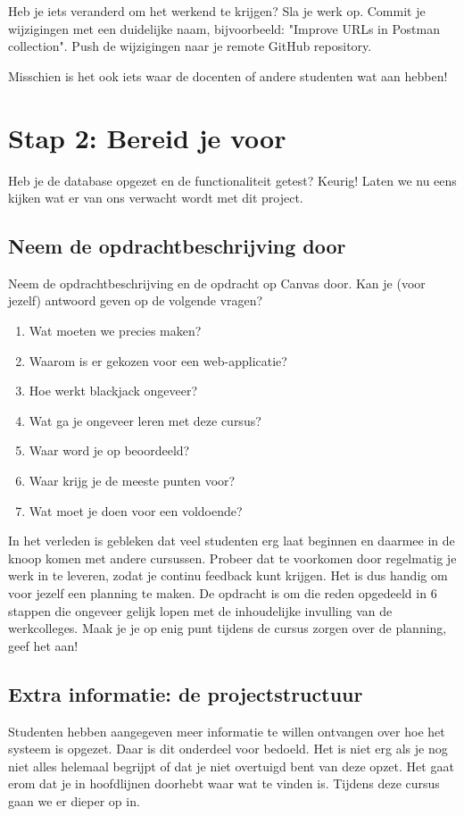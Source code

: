 \documentclass[dutch,a4paper,12pt,doubleside]{book}
\begin{document}
Heb je iets veranderd om het werkend te krijgen? Sla je werk op. 
Commit je wijzigingen met een duidelijke naam, 
bijvoorbeeld: "Improve URLs in Postman collection". 
Push de wijzigingen naar je remote GitHub repository.

Misschien is het ook iets waar de docenten of andere studenten 
wat aan hebben!

\newpage
\section{Stap 2: Bereid je voor}
Heb je de database opgezet en de functionaliteit getest? Keurig!
Laten we nu eens kijken wat er van ons verwacht wordt met dit project.

\subsection{Neem de opdrachtbeschrijving door}
Neem de opdrachtbeschrijving en de opdracht op Canvas door. 
Kan je (voor jezelf) antwoord geven op de volgende vragen?

\begin{enumerate}
    \item Wat moeten we precies maken?
    \item Waarom is er gekozen voor een web-applicatie?
    \item Hoe werkt blackjack ongeveer?
    \item Wat ga je ongeveer leren met deze cursus?
    \item Waar word je op beoordeeld?
    \item Waar krijg je de meeste punten voor?
    \item Wat moet je doen voor een voldoende?
\end{enumerate}

In het verleden is gebleken dat veel studenten erg laat beginnen 
en daarmee in de knoop komen met andere cursussen. Probeer dat te 
voorkomen door regelmatig je werk in te leveren, zodat je continu feedback 
kunt krijgen. Het is dus handig om voor jezelf een planning te maken.
De opdracht is om die reden opgedeeld in 6 stappen die ongeveer gelijk lopen 
met de inhoudelijke invulling van de werkcolleges.
Maak je je op enig punt tijdens de cursus zorgen over de planning,
geef het aan!

\subsection{Extra informatie: de projectstructuur}
Studenten hebben aangegeven meer informatie te willen ontvangen over hoe het 
systeem is opgezet. Daar is dit onderdeel voor bedoeld. Het is niet 
erg als je nog niet alles helemaal begrijpt of dat je niet overtuigd 
bent van deze opzet. Het gaat erom dat je in hoofdlijnen doorhebt 
waar wat te vinden is. Tijdens deze cursus gaan we er dieper op in.
\end{document}
